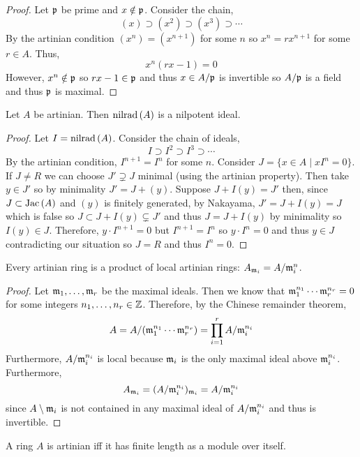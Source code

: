 \documentclass[12pt]{article}
\begin{document}
\begin{proof}
Let $\mathfrak{p}$ be prime and $x \notin \mathfrak{p}$. Consider the chain,
\[ (x) \supset (x^2) \supset (x^3) \supset \cdots \]
By the artinian condition $(x^n) = (x^{n+1})$ for some $n$ so $x^n = r x^{n+1}$ for some $r \in A$. Thus,
\[ x^n(rx - 1) = 0 \] 
However, $x^n \notin \mathfrak{p}$ so $rx - 1 \in \mathfrak{p}$ and thus $x \in A / \mathfrak{p}$ is invertible so $A / \mathfrak{p}$ is a field and thus $\mathfrak{p}$ is maximal.
\end{proof}

\begin{prop}
Let $A$ be artinian. Then $\mathrm{nilrad}\left( A \right)$ is a nilpotent ideal.
\end{prop}

\begin{proof}
Let $I = \mathrm{nilrad}\left( A \right)$. Consider the chain of ideals,
\[ I \supset I^2 \supset I^3 \supset \cdots \]
By the artinian condition, $I^{n+1} = I^n$ for some $n$. Consider $J = \{ x \in A \mid x I^n = 0 \}$. If $J \neq R$ we can choose $J' \supsetneq J$ minimal (using the artinian property). Then take $y \in J'$ so by minimality $J' = J + (y)$. Suppose $J + I(y) = J'$ then, since $J \subset \mathrm{Jac}\left( A \right)$ and $(y)$ is finitely generated, by Nakayama, $J' = J + I(y) = J$ which is false so $J \subset J + I(y) \subsetneq J'$ and thus $J = J + I(y)$ by minimality so $I(y) \in J$. Therefore, $y \cdot I^{n+1} = 0$ but $I^{n+1} = I^n$ so $y \cdot I^n = 0$ and thus $y \in J$ contradicting our situation so $J = R$ and thus $I^n = 0$.
\end{proof}

\begin{prop}
Every artinian ring is a product of local artinian rings: $A_{\mathfrak{m}_i} = A / \mathfrak{m}_i^n$.
\end{prop}

\begin{proof}
Let $\mathfrak{m}_1, \dots, \mathfrak{m}_r$ be the maximal ideals. Then we know that $\mathfrak{m}_1^{n_1} \cdots \mathfrak{m}_r^{n_r} = 0$ for some integers $n_1, \dots, n_r \in \mathbb{Z}$. Therefore, by the Chinese remainder theorem,
\[ A = A / (\mathfrak{m}_1^{n_1} \cdots \mathfrak{m}_r^{n_r}) = \prod_{i = 1}^r A / \mathfrak{m}_i^{n_i} \]
Furthermore, $A / \mathfrak{m}_i^{n_i}$ is local because $\mathfrak{m}_i$ is the only maximal ideal above $\mathfrak{m}_i^{n_i}$. Furthermore, 
\[ A_{\mathfrak{m}_i} = (A / \mathfrak{m}_i^{n_i})_{\mathfrak{m}_i} = A / \mathfrak{m}_i^{n_i} \]
since $A \setminus \mathfrak{m}_i$ is not contained in any maximal ideal of $A / \mathfrak{m}_i^{n_i}$ and thus is invertible.   
\end{proof}

\begin{prop}
A ring $A$ is artinian iff it has finite length as a module over itself.
\end{prop}
\end{document}
